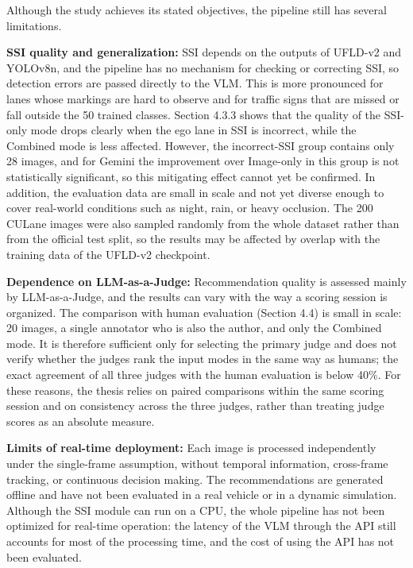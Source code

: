 \documentclass[12pt,a4paper]{report}
\begin{document}
Although the study achieves its stated objectives, the pipeline still has several limitations.

\textbf{SSI quality and generalization:} SSI depends on the outputs of UFLD-v2 and YOLOv8n, and the pipeline has no mechanism for checking or correcting SSI, so detection errors are passed directly to the VLM. This is more pronounced for lanes whose markings are hard to observe and for traffic signs that are missed or fall outside the 50 trained classes. Section 4.3.3 shows that the quality of the SSI-only mode drops clearly when the ego lane in SSI is incorrect, while the Combined mode is less affected. However, the incorrect-SSI group contains only 28 images, and for Gemini the improvement over Image-only in this group is not statistically significant, so this mitigating effect cannot yet be confirmed. In addition, the evaluation data are small in scale and not yet diverse enough to cover real-world conditions such as night, rain, or heavy occlusion. The 200 CULane images were also sampled randomly from the whole dataset rather than from the official test split, so the results may be affected by overlap with the training data of the UFLD-v2 checkpoint.

\textbf{Dependence on LLM-as-a-Judge:} Recommendation quality is assessed mainly by LLM-as-a-Judge, and the results can vary with the way a scoring session is organized. The comparison with human evaluation (Section 4.4) is small in scale: 20 images, a single annotator who is also the author, and only the Combined mode. It is therefore sufficient only for selecting the primary judge and does not verify whether the judges rank the input modes in the same way as humans; the exact agreement of all three judges with the human evaluation is below 40\%. For these reasons, the thesis relies on paired comparisons within the same scoring session and on consistency across the three judges, rather than treating judge scores as an absolute measure.

\textbf{Limits of real-time deployment:} Each image is processed independently under the single-frame assumption, without temporal information, cross-frame tracking, or continuous decision making. The recommendations are generated offline and have not been evaluated in a real vehicle or in a dynamic simulation. Although the SSI module can run on a CPU, the whole pipeline has not been optimized for real-time operation: the latency of the VLM through the API still accounts for most of the processing time, and the cost of using the API has not been evaluated.
\end{document}
